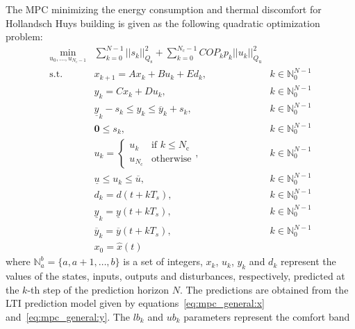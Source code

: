 \documentclass[10pt]{extarticle}
\begin{document}
The MPC minimizing  the energy consumption and  thermal discomfort 
for Hollandsch Huys building is given as the following quadratic optimization problem:
\begin{subequations}
\label{eq:mpc_general}
\begin{align}
 \min_{u_0, \ldots, u_{N_{\text{c}}-1}} & \sum_{k=0}^{N-1}  
 || s_k ||_{Q_\text{s}}^2 +  \sum_{k=0}^{N_{\text{c}}-1} COP_k p_k ||u_k ||_{Q_\text{u}}^2  &
 \label{eq:mpc_general:cost}\\
  \text{s.t.} \ & x_{k+1} = A x_k+ B u_k +E d_k, & k \in \mathbb{N}_{0}^{N-1} \label{eq:mpc_general:x} \\
  & y_{k} = C x_k + D u_k, & k \in \mathbb{N}_{0}^{N-1} \label{eq:mpc_general:y} \\
  & \underline{y}_k - s_k \le y_k \le \overline{y}_k + s_k, & k \in \mathbb{N}_{0}^{N-1} \label{eq:mpc_general:zone} \\
   & \mathbf{0} \le s_k  ,  & k \in \mathbb{N}_{0}^{N-1} \label{eq:mpc_general:lb_sk}\\
    & u_k =  \begin{cases}
    u_k & \text{if } k \leq N_{\text{c}}\\
   u_{N_{\text{c}}}     & \text{otherwise}   \end{cases}, & k \in \mathbb{N}_{0}^{N-1} \label{eq:mpc_general:move_block} \\
  & \underline{u} \le u_k \le \overline{u},  & k \in \mathbb{N}_{0}^{N-1} \label{eq:mpc_general:ub}\\
   & d_k = d(t+ k T_s), & k \in \mathbb{N}_{0}^{N-1} \label{eq:mpc_general:d0} \\
  & \underline{y}_k =  \underline{y}(t+ k T_s), & k \in \mathbb{N}_{0}^{N-1} \label{eq:mpc_general:r_low} \\
    & \overline{y}_k =  \overline{y}(t+ k T_s), & k \in \mathbb{N}_{0}^{N-1} \label{eq:mpc_general:r_up} \\
  & x_0 = \hat{x}(t) \label{eq:mpc_general:x0}
\end{align}
\end{subequations}
where $\mathbb{N}_a^b = \{a, a+1, \ldots, b \}$ is a set of integers,
$x_k$, $u_k$, $y_k$ and $d_k$ represent the values of the states, 
inputs, outputs and disturbances, respectively, 
predicted at the $k$-th step of the prediction horizon $N$.
The predictions are obtained from the LTI prediction
model given by equations~\eqref{eq:mpc_general:x} and~\eqref{eq:mpc_general:y}.
The $lb_k$ and $ub_k$ parameters represent the comfort band 
\end{document}
